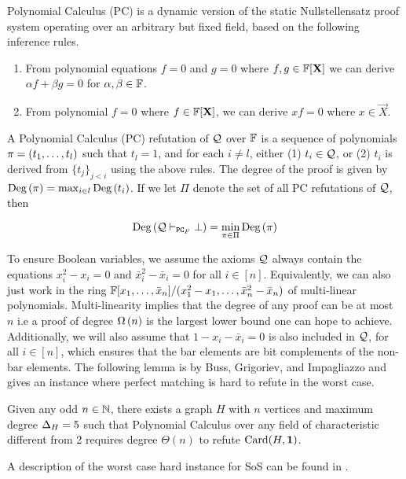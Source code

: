 \documentclass[11pt]{article}
\begin{document}
Polynomial Calculus (PC) is a dynamic version of the static Nullstellensatz proof system \citep[Section 1.3]{fleming2019semialgebraic} operating over an arbitrary but fixed field, based on the following inference rules.
\begin{enumerate}
	\item From polynomial equations $f=0$ and $g=0$ where $f,g \in \mathbb{F}[\mathbf{X}]$ we can derive $\alpha f + \beta g = 0$ for $\alpha, \beta \in \mathbb{F}$.
	\item From polynomial $f=0$ where $f \in \mathbb{F}[\mathbf{X}]$, we can derive $xf=0$ where $x \in \vec{X}$.
\end{enumerate}

\begin{definition}\label{def:poly-calc-refutations}
A Polynomial Calculus (PC) refutation of $\mathcal{Q}$ over $\mathbb{F}$ is a sequence of polynomials $\pi = (t_1, \dots, t_l)$	such that $t_l = 1$, and for each $i \neq l$, either (1) $t_i \in \mathcal{Q}$, or (2) $t_i$ is derived from $\{t_j\}_{j < i}$ using the above rules.
The degree of the proof is given by $\text{Deg}\left(\pi\right) = \max_{i \in l}\text{Deg}\left(t_i\right)$. If we let $\Pi$ denote the set of all PC refutations of $\mathcal{Q}$, then

\[ \text{Deg}\left(\mathcal{Q} \vdash_{\texttt{PC}_F} \bot\right) = \min_{\pi \in \Pi}\text{Deg}\left(\pi\right)\]
\end{definition}

To ensure Boolean variables, we assume the axioms $\mathcal{Q}$ always contain the equations $x_i^2 - x_i=0$ and $\bar{x}^2_i - \bar{x}_i = 0$ for all $i \in [n]$. 
Equivalently, we can also just work in the ring $\mathbb{F}[x_1, \dots, \bar{x}_n]/(x_1^2 - x_1, \dots, \bar{x}_n^2 - \bar{x}_n)$ of multi-linear polynomials.
Multi-linearity implies that the degree of any proof can be at most $n$ i.e a proof of degree $\Omega\left(n\right)$ is the largest lower bound one can hope to achieve.
Additionally, we will also assume that $1 - x_i - \bar{x}_i=0$ is also included in $\mathcal{Q}$, for all $i \in [n]$, which ensures that the bar elements are bit complements of the non-bar elements.
The following lemma is by Buss, Grigoriev, and Impagliazzo \cite{buss1999linear} and gives an instance where perfect matching is hard to refute in the worst case. 

\begin{lemma}\label{lemma:worst-case-instance-PC}Given any odd $n \in \mathbb{N}$, there exists a graph $H$ with $n$ vertices and maximum degree $\Delta_{H}= 5$ such that Polynomial Calculus over any field of characteristic different from 2 requires degree $\Theta(n)$ to refute $\text{Card}(H, \mathbf{1})$.
\end{lemma}
A description of the  worst case hard instance for SoS can be found in \citep[Theorem A.3]{Austrin_2022}.
\end{document}

